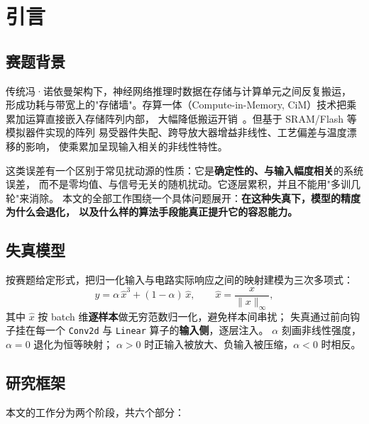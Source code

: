 \documentclass[11pt,a4paper]{ctexart}
\begin{document}
\section{引言}

\subsection{赛题背景}

传统冯·诺依曼架构下，神经网络推理时数据在存储与计算单元之间反复搬运，
形成功耗与带宽上的"存储墙"。存算一体（Compute-in-Memory, CiM）技术把乘累加运算直接嵌入存储阵列内部，
大幅降低搬运开销~\cite{cim_survey,puma}。但基于 SRAM/Flash 等模拟器件实现的阵列
易受器件失配、跨导放大器增益非线性、工艺偏差与温度漂移的影响，
使乘累加呈现输入相关的非线性特性。

这类误差有一个区别于常见扰动源的性质：它是\textbf{确定性的、与输入幅度相关}的系统误差，
而不是零均值、与信号无关的随机扰动。它逐层累积，并且不能用"多训几轮"来消除。
本文的全部工作围绕一个具体问题展开：\textbf{在这种失真下，模型的精度为什么会退化，
以及什么样的算法手段能真正提升它的容忍能力。}

\subsection{失真模型}

按赛题给定形式，把归一化输入与电路实际响应之间的映射建模为三次多项式：
\begin{equation}
y = \alpha\,\hat{x}^3 + (1-\alpha)\,\hat{x},
\qquad
\hat{x} = \frac{x}{\|x\|_\infty},
\label{eq:distortion}
\end{equation}
其中 $\hat{x}$ 按 batch 维\textbf{逐样本}做无穷范数归一化，避免样本间串扰；
失真通过前向钩子挂在每一个 \texttt{Conv2d} 与 \texttt{Linear} 算子的\textbf{输入侧}，逐层注入。
$\alpha$ 刻画非线性强度，$\alpha=0$ 退化为恒等映射；
$\alpha>0$ 时正输入被放大、负输入被压缩，$\alpha<0$ 时相反。

\subsection{研究框架}

本文的工作分为两个阶段，共六个部分：
\end{document}
